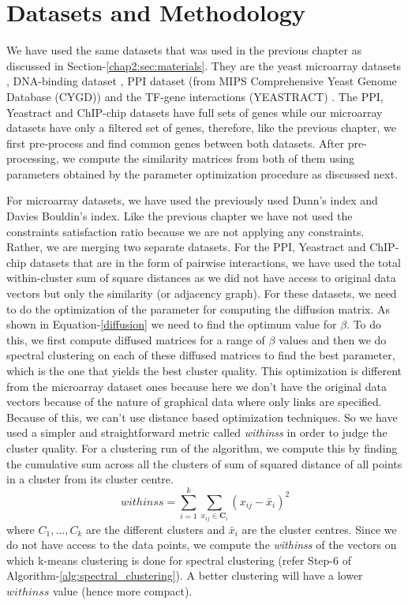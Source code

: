 \section{Datasets and Methodology} \label{chap3:sec:materials}

We have used the same datasets that was used in the previous chapter as discussed in Section-\ref{chap2:sec:materials}. They are the yeast microarray datasets \citep{gasch00genomicexpn,spellman98comprehensive}, DNA-binding dataset \citep{harbison04transcriptional}, PPI dataset (from MIPS Comprehensive Yeast Genome Database (CYGD)) \citep{Gueldener2006MPact} and the TF-gene interactions (YEASTRACT) \citep{Teixeira06yeastract}. The PPI, Yeastract and ChIP-chip datasets have full sets of genes while our microarray datasets have only a filtered set of genes, therefore, like the previous chapter, we first pre-process and find common genes between both datasets. After pre-processing, we compute the similarity matrices from both of them using parameters obtained by the parameter optimization procedure as discussed next. 

For microarray datasets, we have used the previously used Dunn's index and Davies Bouldin's index. Like the previous chapter we have not used the constraints satisfaction ratio because we are not applying any constraints. Rather, we are merging two separate datasets. For the PPI, Yeastract and ChIP-chip datasets that are in the form of pairwise interactions, we have used the total within-cluster sum of square distances as we did not have access to original data vectors but only the similarity (or adjacency graph). For these datasets, we need to do the optimization of the parameter for computing the diffusion matrix. As shown in Equation-\ref{diffusion} we need to find the optimum value for $\beta$. To do this, we first compute diffused matrices for a range of $\beta$ values and then we do spectral clustering on each of these diffused matrices to find the best parameter, which is the one that yields the best cluster quality. This optimization is different from the microarray dataset ones because here we don't have the original data vectors because of the nature of graphical data where only links are specified. Because of this, we can't use distance based optimization techniques. So we have used a simpler and straightforward metric called \textit{withinss} in order to judge the cluster quality. For a clustering run of the algorithm, we compute this by finding the cumulative sum across all the clusters of sum of squared distance of all points in a cluster from its cluster centre.
\begin{equation}
    \mathit{withinss}=\sum_{i=1}^{k}\sum_{x_{ij}\in \mathbf{C}_{i}}(x_{ij}-\bar{x}_{i})^2
\end{equation}
where $C_{1},\dots,C_{k}$ are the different clusters and $\bar{x}_{i}$ are the cluster centres. Since we do not have access to the data points, we compute the \textit{withinss} of the vectors on which k-means clustering is done for spectral clustering (refer Step-6 of Algorithm-\ref{alg:spectral_clustering}). A better clustering will have a lower $withinss$ value (hence more compact). 
 
